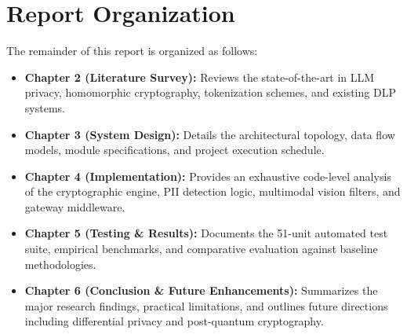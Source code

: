 \section{Report Organization}
The remainder of this report is organized as follows:
\begin{itemize}[leftmargin=*]
    \item \textbf{Chapter 2 (Literature Survey):} Reviews the state-of-the-art in LLM privacy, homomorphic cryptography, tokenization schemes, and existing DLP systems.
    \item \textbf{Chapter 3 (System Design):} Details the architectural topology, data flow models, module specifications, and project execution schedule.
    \item \textbf{Chapter 4 (Implementation):} Provides an exhaustive code-level analysis of the cryptographic engine, PII detection logic, multimodal vision filters, and gateway middleware.
    \item \textbf{Chapter 5 (Testing \& Results):} Documents the 51-unit automated test suite, empirical benchmarks, and comparative evaluation against baseline methodologies.
    \item \textbf{Chapter 6 (Conclusion \& Future Enhancements):} Summarizes the major research findings, practical limitations, and outlines future directions including differential privacy and post-quantum cryptography.
\end{itemize}

